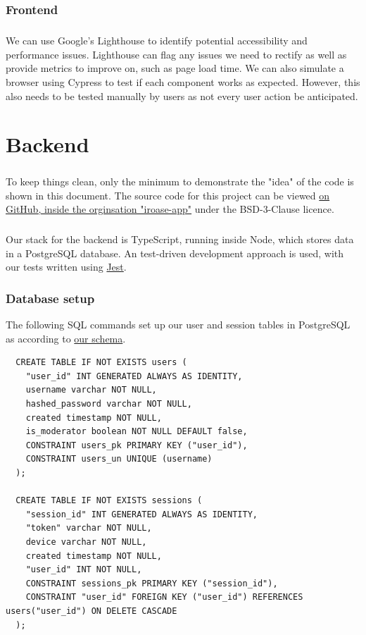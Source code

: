 \documentclass{report}
\begin{document}
\subsection{Frontend}
\paragraph{}
We can use Google's Lighthouse to identify potential accessibility and performance issues. Lighthouse can flag any issues we need to rectify as well as provide metrics to improve on, such as page load time. We can also simulate a browser using Cypress to test if each component works as expected. However, this also needs to be tested manually by users as not every user action be anticipated.

\chapter{Backend}
\paragraph{}
To keep things clean, only the minimum to demonstrate the "idea" of the code is shown in this document. The source code for this project can be viewed \href{https://github.com/iroase-app}{on GitHub, inside the orginsation "iroase-app"} under the BSD-3-Clause licence.

\paragraph{}
Our stack for the backend is TypeScript, running inside Node, which stores data in a PostgreSQL database. An test-driven development approach is used, with our tests written using \href{https://jestjs.io}{Jest}.

\subsection{Database setup}
The following SQL commands set up our user and session tables in PostgreSQL as according to \hyperref[fig:database1]{our schema}.

\begin{verbatim}
  CREATE TABLE IF NOT EXISTS users (
    "user_id" INT GENERATED ALWAYS AS IDENTITY,
    username varchar NOT NULL,
    hashed_password varchar NOT NULL,
    created timestamp NOT NULL,
    is_moderator boolean NOT NULL DEFAULT false,
    CONSTRAINT users_pk PRIMARY KEY ("user_id"),
    CONSTRAINT users_un UNIQUE (username)
  );

  CREATE TABLE IF NOT EXISTS sessions (
    "session_id" INT GENERATED ALWAYS AS IDENTITY,
    "token" varchar NOT NULL,
    device varchar NOT NULL,
    created timestamp NOT NULL,
    "user_id" INT NOT NULL,
    CONSTRAINT sessions_pk PRIMARY KEY ("session_id"),
    CONSTRAINT "user_id" FOREIGN KEY ("user_id") REFERENCES users("user_id") ON DELETE CASCADE
  );
\end{verbatim}
\end{document}
